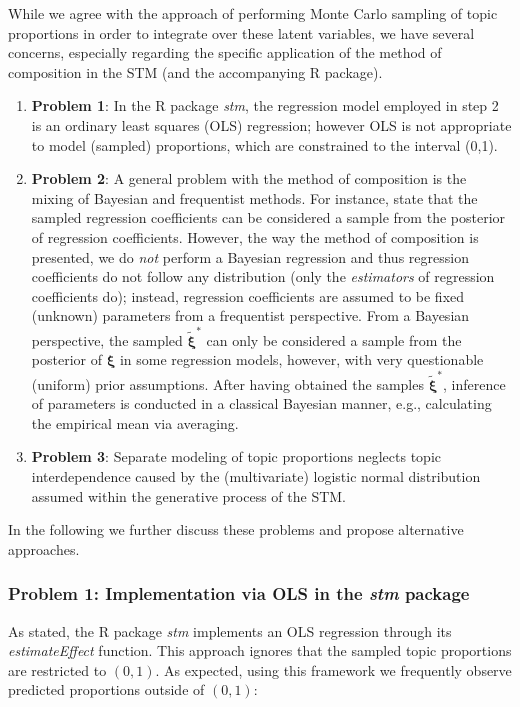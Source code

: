 While we agree with the approach of performing Monte Carlo sampling of topic proportions in order to integrate over these latent variables, we have several concerns, especially regarding the specific application of the method of composition in the STM (and the accompanying R package).
\begin{enumerate}
\item \textbf{Problem 1}: In the R package \textit{stm}, the regression model employed in step 2 is an ordinary least squares (OLS) regression; however OLS is not appropriate to model (sampled) proportions, which are constrained to the interval (0,1).
\item \textbf{Problem 2}: A general problem with the method of composition is the mixing of Bayesian and frequentist methods. For instance, \cite{treier2008democracy} state that the sampled regression coefficients can be considered a sample from the posterior of regression coefficients. However, the way the method of composition is presented, we do \textit{not} perform a Bayesian regression and thus regression coefficients do not follow any distribution (only the \textit{estimators} of regression coefficients do); instead, regression coefficients are assumed to be fixed (unknown) parameters from a frequentist perspective. From a Bayesian perspective, the sampled $\tilde{\boldsymbol{\xi}}^*$ can only be considered a sample from the posterior of $\boldsymbol{\xi}$ in some regression models, however, with very questionable (uniform) prior assumptions. After having obtained the samples $\tilde{\boldsymbol{\xi}}^*$, inference of parameters is conducted in a classical Bayesian manner, e.g., calculating the empirical mean via averaging.
\item \textbf{Problem 3}: Separate modeling of topic proportions neglects topic interdependence caused by the (multivariate) logistic normal distribution assumed within the generative process of the STM.
\end{enumerate}
In the following we further discuss these problems and propose alternative approaches.

\subsubsection{Problem 1: Implementation via OLS in the \textit{stm} package}

\noindent As stated, the R package \textit{stm} implements an OLS regression through its \textit{estimateEffect} function. This approach ignores that the sampled topic proportions are restricted to $(0,1)$. As expected, using this framework we frequently observe predicted proportions outside of $(0,1)$:\\

